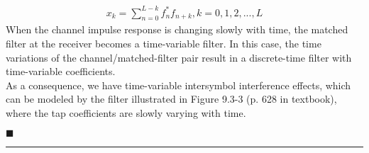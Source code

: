 \documentclass[a4paper,12pt]{article}
\begin{document}
\begin{enumerate}
            \begin{align*}
                x_k = \sum_{n = 0}^{L - k} f_n^*f_{n + k}, k = 0, 1, 2, ..., L
            \end{align*}
            When the channel impulse response is changing slowly with time, the matched filter at the receiver becomes a time-variable filter. In this case, the time variations of the channel/matched-filter pair result in a discrete-time filter with time-variable coefficients. \\ 
            As a consequence, we have time-variable intersymbol interference effects, which can be modeled by the filter illustrated in Figure 9.3-3 (p. 628 in textbook), where the tap coefficients are slowly varying with time. 
            \begin{flushright}
                $\blacksquare$
            \end{flushright}
    \end{enumerate}
    \rule{\textwidth}{0.4pt}
\end{document}

